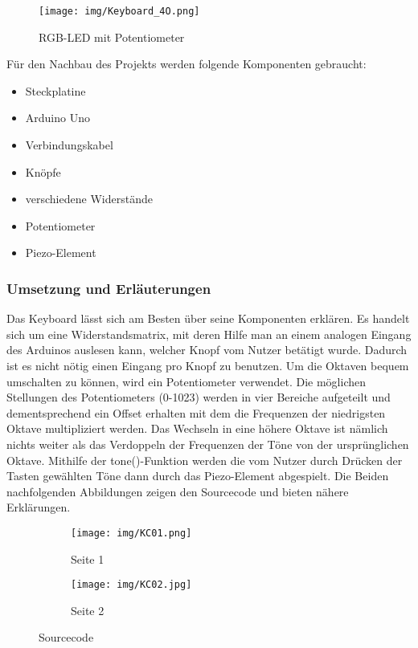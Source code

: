 \begin{figure}[h]
\begin{center}
\texttt{[image: img/Keyboard\_4O.png]}
\caption{RGB-LED mit Potentiometer}
\label{rgb_project}
\end{center}
\end{figure}

Für den Nachbau des Projekts werden folgende Komponenten gebraucht:
\begin{itemize}
\item{Steckplatine}
\item{Arduino Uno}
\item{Verbindungskabel}
\item{Knöpfe}
\item{verschiedene Widerstände}
\item{Potentiometer}
\item{Piezo-Element}
\end{itemize}

\subsubsection{Umsetzung und Erläuterungen}
Das Keyboard lässt sich am Besten über seine Komponenten erklären.
Es handelt sich um eine Widerstandsmatrix, mit deren Hilfe man an einem analogen Eingang des Arduinos auslesen kann,
welcher Knopf vom Nutzer betätigt wurde. Dadurch ist es nicht nötig einen Eingang pro Knopf zu benutzen.
Um die Oktaven bequem umschalten zu können, wird ein Potentiometer verwendet. Die möglichen Stellungen des Potentiometers (0-1023) werden in vier Bereiche aufgeteilt und dementsprechend ein Offset erhalten mit dem die Frequenzen der niedrigsten Oktave multipliziert werden.
Das Wechseln in eine höhere Oktave ist nämlich nichts weiter als das Verdoppeln der Frequenzen der Töne von der ursprünglichen Oktave.
Mithilfe der tone()-Funktion werden die vom Nutzer durch Drücken der Tasten gewählten Töne dann durch das Piezo-Element abgespielt.
Die Beiden nachfolgenden Abbildungen zeigen den Sourcecode und bieten nähere Erklärungen.

\begin{figure}[h]
	\centering
	\begin{subfigure}[b]{0.48\linewidth}
		\centering
		\texttt{[image: img/KC01.png]}
		\caption{Seite 1}\label{stehend}
	\end{subfigure}\enspace%
	\begin{subfigure}[b]{0.48\linewidth}
		\centering
		\texttt{[image: img/KC02.jpg]}
		\caption{Seite 2}\label{laufend}
	\end{subfigure}
	\caption{Sourcecode}\label{Zeituhr}
\end{figure}

